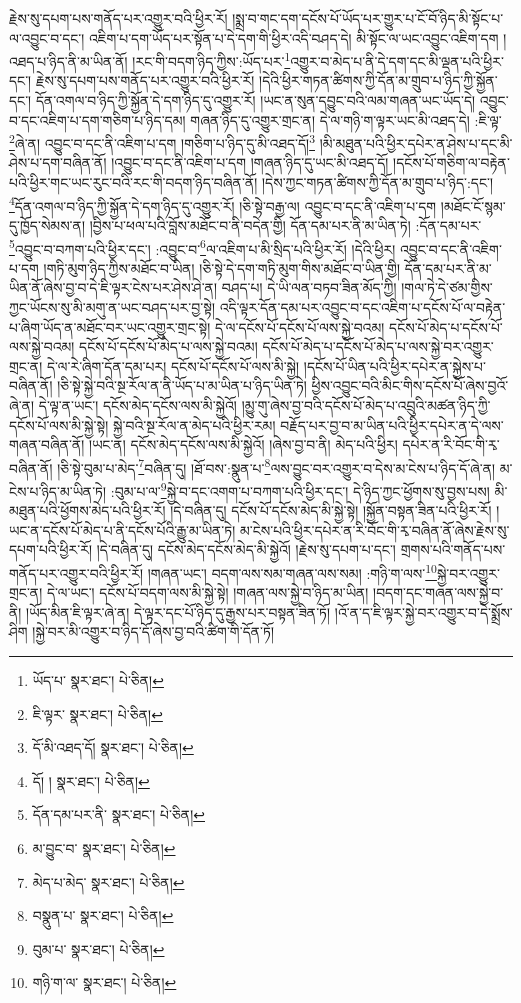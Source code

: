 རྗེས་སུ་དཔག་པས་གནོད་པར་འགྱུར་བའི་ཕྱིར་རོ། །སྨྲ་བ་གང་དག་དངོས་པོ་ཡོད་པར་གྱུར་པ་ངོ་བོ་ཉིད་མི་སྟོང་པ་ལ་འབྱུང་བ་དང་། འཇིག་པ་དག་ཡོད་པར་སྟོན་པ་དེ་དག་གི་ཕྱིར་འདི་བཤད་དེ། མི་སྟོང་ལ་ཡང་འབྱུང་འཇིག་དག །འཐད་པ་ཉིད་ནི་མ་ཡིན་ནོ། །རང་གི་བདག་ཉིད་ཀྱིས་:ཡོད་པར་\footnote{ཡོད་པ་  སྣར་ཐང་།  པེ་ཅིན། }འགྱུར་བ་མེད་པ་ནི་དེ་དག་དང་མི་ལྡན་པའི་ཕྱིར་དང་། རྗེས་སུ་དཔག་པས་གནོད་པར་འགྱུར་བའི་ཕྱིར་རོ། །དེའི་ཕྱིར་གཏན་ཚིགས་ཀྱི་དོན་མ་གྲུབ་པ་ཉིད་ཀྱི་སྐྱོན་དང་། དོན་འགལ་བ་ཉིད་ཀྱི་སྐྱོན་དེ་དག་ཉིད་དུ་འགྱུར་རོ། །ཡང་ན་སུན་དབྱུང་བའི་ལམ་གཞན་ཡང་ཡོད་དེ། འབྱུང་བ་དང་འཇིག་པ་དག་གཅིག་པ་ཉིད་དམ། གཞན་ཉིད་དུ་འགྱུར་གྲང་ན། དེ་ལ་གཉི་ག་ལྟར་ཡང་མི་འཐད་དེ། :ཇི་ལྟ་\footnote{ཇི་ལྟར་  སྣར་ཐང་།  པེ་ཅིན། }ཞེ་ན། འབྱུང་བ་དང་ནི་འཇིག་པ་དག །གཅིག་པ་ཉིད་དུ་མི་འཐད་དོ།\footnote{དོ་མི་འཐད་དོ།  སྣར་ཐང་།  པེ་ཅིན། } །མི་མཐུན་པའི་ཕྱིར་དཔེར་ན་ཤེས་པ་དང་མི་ཤེས་པ་དག་བཞིན་ནོ། །འབྱུང་བ་དང་ནི་འཇིག་པ་དག །གཞན་ཉིད་དུ་ཡང་མི་འཐད་དོ། །དངོས་པོ་གཅིག་ལ་བརྟེན་པའི་ཕྱིར་གང་ཡང་རུང་བའི་རང་གི་བདག་ཉིད་བཞིན་ནོ། །དེས་ཀྱང་གཏན་ཚིགས་ཀྱི་དོན་མ་གྲུབ་པ་ཉིད་:དང་། \footnote{དོ། །   སྣར་ཐང་།  པེ་ཅིན། }དོན་འགལ་བ་ཉིད་ཀྱི་སྐྱོན་དེ་དག་ཉིད་དུ་འགྱུར་རོ། །ཅི་སྟེ་བརྒྱ་ལ། འབྱུང་བ་དང་ནི་འཇིག་པ་དག །མཐོང་ངོ་སྙམ་དུ་ཁྱོད་སེམས་ན། །བྱིས་པ་ཕལ་པའི་བློས་མཐོང་བ་ནི་བདེན་གྱི། དོན་དམ་པར་ནི་མ་ཡིན་ཏེ། :དོན་དམ་པར་\footnote{དོན་དམ་པར་ནི་  སྣར་ཐང་།  པེ་ཅིན། }འབྱུང་བ་བཀག་པའི་ཕྱིར་དང་། :འབྱུང་བ་\footnote{མ་བྱུང་བ་  སྣར་ཐང་།  པེ་ཅིན། }ལ་འཇིག་པ་མི་སྲིད་པའི་ཕྱིར་རོ། །དེའི་ཕྱིར། འབྱུང་བ་དང་ནི་འཇིག་པ་དག །གཏི་མུག་ཉིད་ཀྱིས་མཐོང་བ་ཡིན། །ཅི་སྟེ་དེ་དག་གཏི་མུག་གིས་མཐོང་བ་ཡིན་གྱི། དོན་དམ་པར་ནི་མ་ཡིན་ནོ་ཞེས་བྱ་བ་དེ་ཇི་ལྟར་ངེས་པར་ཤེས་ཤེ་ན། བཤད་པ། དེ་ཡི་ལན་བཏབ་ཟིན་མོད་ཀྱི། །གལ་ཏེ་དེ་ཙམ་གྱིས་ཀྱང་ཡོངས་སུ་མི་མགུ་ན་ཡང་བཤད་པར་བྱ་སྟེ། འདི་ལྟར་དོན་དམ་པར་འབྱུང་བ་དང་འཇིག་པ་དངོས་པོ་ལ་བརྟེན་པ་ཞིག་ཡོད་ན་མཐོང་བར་ཡང་འགྱུར་གྲང་སྟེ། དེ་ལ་དངོས་པོ་དངོས་པོ་ལས་སྐྱེ་བའམ། དངོས་པོ་མེད་པ་དངོས་པོ་ལས་སྐྱེ་བའམ། དངོས་པོ་དངོས་པོ་མེད་པ་ལས་སྐྱེ་བའམ། དངོས་པོ་མེད་པ་དངོས་པོ་མེད་པ་ལས་སྐྱེ་བར་འགྱུར་གྲང་ན། དེ་ལ་རེ་ཞིག་དོན་དམ་པར། དངོས་པོ་དངོས་པོ་ལས་མི་སྐྱེ། །དངོས་པོ་ཡིན་པའི་ཕྱིར་དཔེར་ན་སྐྱེས་པ་བཞིན་ནོ། །ཅི་སྟེ་སྐྱེ་བའི་སྔ་རོལ་ན་ནི་ཡོད་པ་མ་ཡིན་པ་ཉིད་ཡིན་ཏེ། ཕྱིས་འབྱུང་བའི་མིང་གིས་དངོས་པོ་ཞེས་བྱའོ་ཞེ་ན། དེ་ལྟ་ན་ཡང་། དངོས་མེད་དངོས་ལས་མི་སྐྱེའོ། །མྱུ་གུ་ཞེས་བྱ་བའི་དངོས་པོ་མེད་པ་འབྲུའི་མཚན་ཉིད་ཀྱི་དངོས་པོ་ལས་མི་སྐྱེ་སྟེ། སྐྱེ་བའི་སྔ་རོལ་ན་མེད་པའི་ཕྱིར་རམ། བརྗོད་པར་བྱ་བ་མ་ཡིན་པའི་ཕྱིར་དཔེར་ན་དེ་ལས་གཞན་བཞིན་ནོ། །ཡང་ན། དངོས་མེད་དངོས་ལས་མི་སྐྱེའོ། །ཞེས་བྱ་བ་ནི། མེད་པའི་ཕྱིར། དཔེར་ན་རི་བོང་གི་རྭ་བཞིན་ནོ། །ཅི་སྟེ་བུམ་པ་མེད་\footnote{མེད་པ་མེད་  སྣར་ཐང་།  པེ་ཅིན། }བཞིན་དུ། །ཐོ་བས་:སྣུན་པ་\footnote{བསྣུན་པ་  སྣར་ཐང་།  པེ་ཅིན། }ལས་བྱུང་བར་འགྱུར་བ་དེས་མ་ངེས་པ་ཉིད་དོ་ཞེ་ན། མ་ངེས་པ་ཉིད་མ་ཡིན་ཏེ། :བུམ་པ་ལ་\footnote{བུམ་པ་  སྣར་ཐང་།  པེ་ཅིན། }སྐྱེ་བ་དང་འགག་པ་བཀག་པའི་ཕྱིར་དང་། དེ་ཉིད་ཀྱང་ཕྱོགས་སུ་བྱས་པས། མི་མཐུན་པའི་ཕྱོགས་མེད་པའི་ཕྱིར་རོ། །དེ་བཞིན་དུ། དངོས་པོ་དངོས་མེད་མི་སྐྱེ་སྟེ། །སྐྱོན་བསྟན་ཟིན་པའི་ཕྱིར་རོ། །ཡང་ན་དངོས་པོ་མེད་པ་ནི་དངོས་པོའི་རྒྱུ་མ་ཡིན་ཏེ། མ་ངེས་པའི་ཕྱིར་དཔེར་ན་རི་བོང་གི་རྭ་བཞིན་ནོ་ཞེས་རྗེས་སུ་དཔག་པའི་ཕྱིར་རོ། །དེ་བཞིན་དུ། དངོས་མེད་དངོས་མེད་མི་སྐྱེའོ། །རྗེས་སུ་དཔག་པ་དང་། གྲགས་པའི་གནོད་པས་གནོད་པར་འགྱུར་བའི་ཕྱིར་རོ། །གཞན་ཡང་། བདག་ལས་སམ་གཞན་ལས་སམ། :གཉི་ག་ལས་\footnote{གཉི་ག་ལ་  སྣར་ཐང་།  པེ་ཅིན། }སྐྱེ་བར་འགྱུར་གྲང་ན། དེ་ལ་ཡང་། དངོས་པོ་བདག་ལས་མི་སྐྱེ་སྟེ། །གཞན་ལས་སྐྱེ་བ་ཉིད་མ་ཡིན། །བདག་དང་གཞན་ལས་སྐྱེ་བ་ནི། །ཡོད་མིན་ཇི་ལྟར་ཞེ་ན། དེ་ལྟར་དང་པོ་ཉིད་དུ་རྒྱས་པར་བསྟན་ཟིན་ཏོ། །འོ་ན་ད་ཇི་ལྟར་སྐྱེ་བར་འགྱུར་བ་དེ་སྨྲོས་ཤིག །སྐྱེ་བར་མི་འགྱུར་བ་ཉིད་དོ་ཞེས་བྱ་བའི་ཚིག་གི་དོན་ཏོ། 